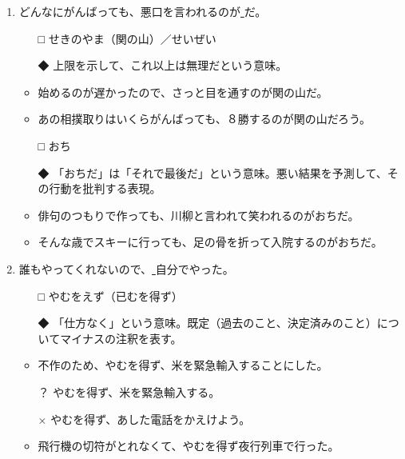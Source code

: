 \documentclass[
uplatex,
b5paper,
10pt,
dvipdfmx
]{jsbook}
\begin{document}
\begin{enumerate}
\item どんなにがんばっても、悪口を言われるのが\underline{     }だ。
\begin{itemize}
\item[□] せきのやま（関の山）／せいぜい
\item[◆] 上限を示して、これ以上は無理だという意味。
\end{itemize}
\begin{itemize}
\item 始めるのが遅かったので、さっと目を通すのが関の山だ。
\item あの相撲取りはいくらがんばっても、８勝するのが関の山だろう。
\end{itemize}

\begin{itemize}
\item[□] おち
\item[◆] 「おちだ」は「それで最後だ」という意味。悪い結果を予測して、そ
	  の行動を批判する表現。
\end{itemize}
\begin{itemize}
\item 俳句のつもりで作っても、川柳と言われて笑われるのがおちだ。
\item そんな歳でスキーに行っても、足の骨を折って入院するのがおちだ。
\end{itemize}

\item 誰もやってくれないので、\underline{    }自分でやった。
\begin{itemize}
\item[□] やむをえず（已むを得ず）
\item[◆] 「仕方なく」という意味。既定（過去のこと、決定済みのこと）につ
	  いてマイナスの注釈を表す。
\end{itemize}
\begin{itemize}
\item 不作のため、やむを得ず、米を緊急輸入することにした。
\item[？] やむを得ず、米を緊急輸入する。
\item[×] やむを得ず、あした電話をかえけよう。
\item 飛行機の切符がとれなくて、やむを得ず夜行列車で行った。
\end{itemize}


\end{enumerate}
\end{document}
